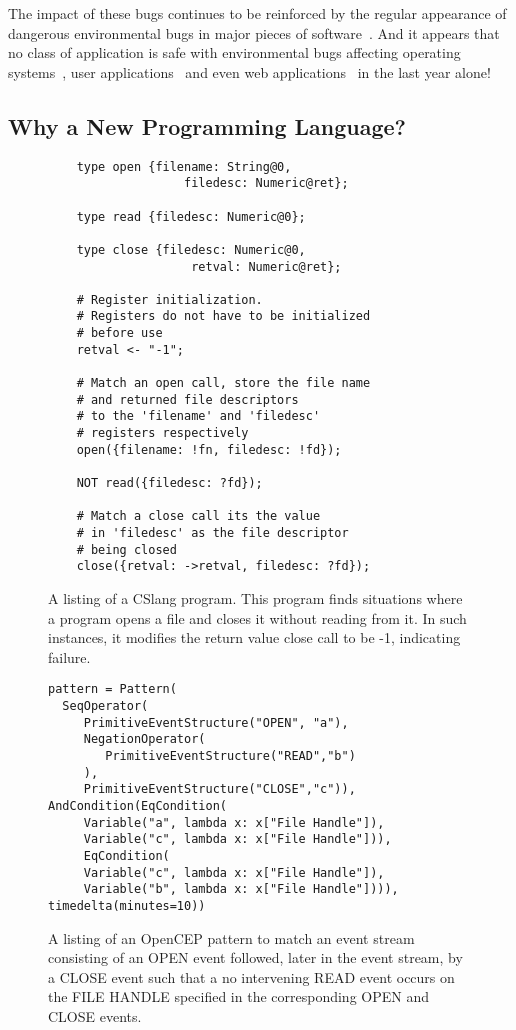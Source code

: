 The impact of these bugs continues to be reinforced by the regular
appearance of dangerous environmental bugs in major pieces of
software~\cite{devzeroroot}.  And it appears that no class of application
is safe with environmental bugs affecting operating systems~\cite{bad},
user applications~\cite{bad} and even web applications~\cite{bad} in the
last year alone!





\subsection{Why a New Programming Language?}
\begin{figure}
  \begin{lstlisting}
    type open {filename: String@0,
                   filedesc: Numeric@ret};

    type read {filedesc: Numeric@0};

    type close {filedesc: Numeric@0,
                    retval: Numeric@ret};

    # Register initialization.
    # Registers do not have to be initialized
    # before use
    retval <- "-1";

    # Match an open call, store the file name
    # and returned file descriptors
    # to the 'filename' and 'filedesc'
    # registers respectively
    open({filename: !fn, filedesc: !fd});

    NOT read({filedesc: ?fd});

    # Match a close call its the value
    # in 'filedesc' as the file descriptor
    # being closed
    close({retval: ->retval, filedesc: ?fd});

  \end{lstlisting}
  \caption{A listing of a CSlang program.  This program finds situations
  where a program opens a file and closes it without reading from it.  In
  such instances, it modifies the return value close call to be -1,
  indicating failure.}
  \label{fig:cslanglisting}
\end{figure}

\begin{figure}
  \begin{lstlisting}
pattern = Pattern(
  SeqOperator(
     PrimitiveEventStructure("OPEN", "a"),
     NegationOperator(
        PrimitiveEventStructure("READ","b")
     ),
     PrimitiveEventStructure("CLOSE","c")),
AndCondition(EqCondition(
     Variable("a", lambda x: x["File Handle"]),
     Variable("c", lambda x: x["File Handle"])),
     EqCondition(
     Variable("c", lambda x: x["File Handle"]),
     Variable("b", lambda x: x["File Handle"]))),
timedelta(minutes=10))
  \end{lstlisting}
  \caption{
    A listing of an OpenCEP pattern to match an event stream consisting of an OPEN event followed, later in the event stream, by a CLOSE event such that a no intervening READ event occurs on the FILE HANDLE specified in the corresponding OPEN and CLOSE events.
}
  \label{fig:OpenCEPListing}
\end{figure}


